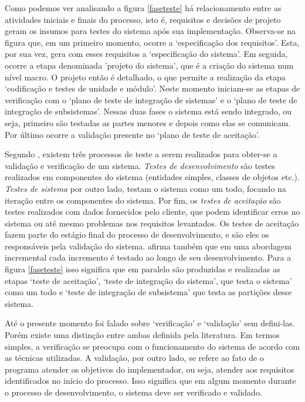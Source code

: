 Como podemos ver analisando a figura \ref{faseteste} há relacionamento entre as atividades iniciais e finais do processo, isto é, requisitos e decisões de projeto geram os insumos para testes do sistema após sua implementação. Observa-se na figura que, em um primeiro momento, ocorre a `especificação dos requisitos'. Esta, por sua vez, gera com esses requisitos a `especificação do sistema'. Em seguida, ocorre a etapa denominada 'projeto do sistema', que é a criação do sistema num nível macro. O projeto então é detalhado, o que permite a realização da etapa  `codificação e testes de unidade e módulo'. Neste momento iniciam-se as etapas de verificação com o `plano de teste de integração de sistemas' e o `plano de teste de integração de subsistemas'. Nessas duas fases o sistema está sendo integrado, ou seja, primeiro são testadas as partes menores e depois como elas se comunicam. Por último ocorre a validação presente no `plano de teste de aceitação'.

Segundo , existem três processos de teste a serem realizados para obter-se a validação e verificação de um sistema. \textit{Testes de desenvolvimento} são testes realizados em componentes do sistema (entidades simples, classes de objetos etc.). \textit{Testes de sistema} por outro lado, testam o sistema como um todo, focando na iteração entre os componentes do sistema. Por fim, os \textit{testes de aceitação} são testes realizados com dados fornecidos
pelo cliente, que podem identificar erros no sistema ou até mesmo problemas nos requisitos levantados. Os testes de aceitação fazem parte do estágio final do processo de desenvolvimento, e são eles os responsáveis pela validação do sistema.  afirma também que em uma abordagem incremental cada incremento é testado ao longo de seu desenvolvimento.
Para a figura \ref{faseteste} isso significa que em paralelo são produzidas e realizadas as etapas `teste de aceitação', `teste de integração do sistema', que testa o sistema' como um todo e `teste de integração de subsistema' que testa as partições desse sistema.



Até o presente momento foi falado sobre `verificação' e `validação' sem defini-las. Porém existe uma distinção entre ambas definida pela literatura. Em termos simples, a verificação se preocupa com o funcionamento do sistema de acordo com as técnicas utilizadas. A validação, por outro lado, se refere ao fato de o programa atender os objetivos do implementador, ou seja, atender aos requisitos identificados no início do processo. Isso significa que em algum momento durante o processo de desenvolvimento, o sistema deve ser verificado e validado. 


